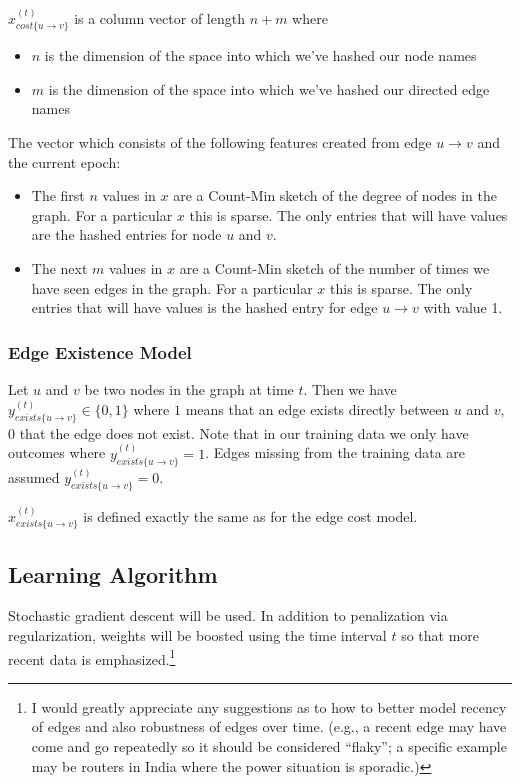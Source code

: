 \documentclass{article} %
\begin{document}
$x_{cost\{u \rightarrow v\}}^{(t)}$ is a column vector of length $n+m$
where 
\begin{itemize}
\item $n$ is the dimension of the space into which we've hashed our node names
\item $m$ is the dimension of the space into which we've hashed our directed
edge names
\end{itemize}

The vector which consists of the following features created from
edge $u \rightarrow v$ and the current epoch:
\begin{itemize}
\item The first $n$ values in $x$ are a Count-Min sketch of the degree of nodes in
  the graph.  For a particular $x$ this is sparse.  The only entries that will have values are the hashed entries for node $u$ and $v$.
\item The next $m$ values in $x$ are a Count-Min sketch of the number of
  times we have seen edges in the graph.  For a particular $x$ this is
  sparse.  The only entries that will have values is the hashed entry for
  edge $u \rightarrow v$ with value 1.
\end{itemize}

\subsubsection{Edge Existence Model}

Let $u$ and $v$ be two nodes in the graph at time $t$.  Then we have
$y_{exists\{u \rightarrow v\}}^{(t)} \in \{0,1\}$ where $1$ means that an edge exists directly
between $u$ and $v$, $0$ that the edge does not exist.  Note that in our
training data we only have outcomes where $y_{exists\{u \rightarrow v\}}^{(t)} = 1$.
Edges missing from the training data are assumed $y_{exists\{u \rightarrow v\}}^{(t)} = 0$.

$x_{exists\{u \rightarrow v\}}^{(t)}$ is defined exactly the same as for the
edge cost model.

\subsection{Learning Algorithm}

Stochastic gradient descent will be used.  In addition to penalization via
regularization, weights will be boosted using the time interval $t$ so that more
recent data is emphasized.\footnote{I would greatly appreciate any
  suggestions as to how to better model recency of edges and also robustness
  of edges over time.  (e.g., a recent edge may have come and go repeatedly so it
  should be considered ``flaky''; a specific example may be routers in India
  where the power situation is sporadic.)}
\end{document}
